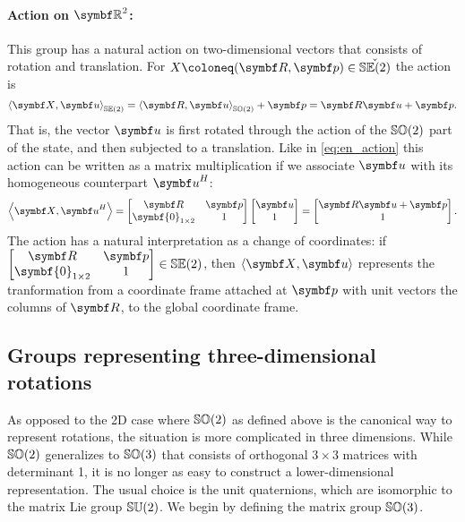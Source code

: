 \paragraph{Action on $\mathbb{\bR}^2$:}
This group has a natural action on two-dimensional vectors that consists of rotation and translation. For $X \coloneq (\bR, \bp) \in \check {\SEtwo}$ the action is
\begin{equation}
  \left \langle \X, \bu \right \rangle_{\SEtwo} = \left \langle \bR, \bu \right \rangle_{\SOtwo} + \bp = \bR \bu + \bp.
\end{equation}
That is, the vector $\bu$ is first rotated through the action of the ${\mathbb{SO}(2)}$ part of the state, and then subjected to a translation. Like in \eqref{eq:en_action} this action can be written as a matrix multiplication if we associate $\bu$ with its homogeneous counterpart $\bu^H$:
\begin{equation}
  \left \langle \X, \bu^H \right \rangle = \begin{bmatrix}
    \bR & \bp \\ \symbf{0}_{1 \times 2} & 1
  \end{bmatrix} \begin{bmatrix}
    \symbf u \\ 1
  \end{bmatrix} = \begin{bmatrix}
    \bR \bu + \bp \\ 1
  \end{bmatrix}.
\end{equation}
The action has a natural interpretation as a change of coordinates: if $\begin{bmatrix} \bR & \bp \\ \symbf{0}_{1 \times 2} & 1 \end{bmatrix} \in \SEtwo$, then $\left \langle \X, \bu \right \rangle$ represents the tranformation from a coordinate frame attached at $\bp$ with unit vectors the columns of $\bR$, to the global coordinate frame.


\subsection{Groups representing three-dimensional rotations}

As opposed to the 2D case where ${\mathbb{SO}(2)}$ as defined above is the canonical way to represent rotations, the situation is more complicated in three dimensions. While ${\mathbb{SO}(2)}$ generalizes to ${\mathbb{SO}(3)}$ that consists of orthogonal $3 \times 3$ matrices with determinant 1, it is no longer as easy to construct a lower-dimensional representation. The usual choice is the unit quaternions, which are isomorphic to the matrix Lie group ${\mathbb{SU}(2)}$. We begin by defining the matrix group ${\mathbb{SO}(3)}$.

